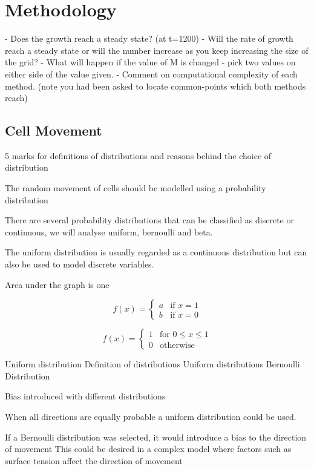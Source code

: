 \chapter{Methodology}

- Does the growth reach a steady state? (at t=1200)
- Will the rate of growth reach a steady state or will the number increase as you keep increasing the size of the grid?
- What will happen if the value of M is changed - pick two values on either side of the value given.
- Comment on computational complexity of each method. (note you had been asked to locate common-points which both methods reach)

\section{Cell Movement}

5 marks for definitions of distributions and reasons behind the choice of distribution

The random movement of cells should be modelled using a probability distribution


There are several probability distributions that can be classified as discrete or continuous, we will analyse uniform, bernoulli and beta.

The uniform distribution is usually regarded as a continuous distribution but can also be used to model discrete variables. 

Area under the graph is one

\[ f(x) =\begin{cases}a & \text{if } x = 1\\b & \text{if } x = 0\end{cases}\]

\[ f(x) =\begin{cases}1 & \text{for } 0  \leq x  \leq  1\\0 & \text{otherwise}\end{cases}\]

Uniform distribution
Definition of distributions
Uniform distributions
Bernoulli Distribution

Bias introduced with different distributions


When all directions are equally probable a uniform distribution could be used.

If a Bernoulli distribution was selected, it would introduce a bias to the direction of movement
This could be desired in a complex model where factors such as surface tension affect the direction of movement


